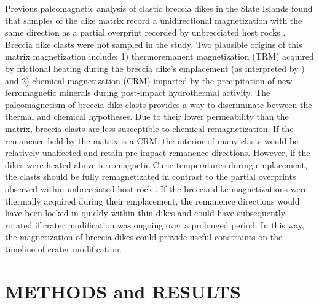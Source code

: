 \documentclass[11pt,letterpaper]{article}
\begin{document}
Previous paleomagnetic analysis of clastic breccia dikes in the Slate Islands found that samples of the dike matrix record a unidirectional magnetization with the same direction as a partial overprint recorded by unbrecciated host rocks \citep*{Halls1979a}. Breccia dike clasts were not sampled in the \cite{Halls1979a} study. Two plausible origins of this matrix magnetization include: 1) thermoremanent magnetization (TRM) acquired by frictional heating during the breccia dike's emplacement (as interpreted by \cite{Halls1979a}) and 2) chemical magnetization (CRM) imparted by the precipitation of new ferromagnetic minerals during post-impact hydrothermal activity. The paleomagnetism of breccia dike clasts provides a way to discriminate between the thermal and chemical hypotheses. Due to their lower permeability than the matrix, breccia clasts are less susceptible to chemical remagnetization. If the remanence held by the matrix is a CRM, the interior of many clasts would be relatively unaffected and retain pre-impact remanence directions. However, if the dikes were heated above ferromagnetic Curie temperatures during emplacement, the clasts should be fully remagnetizated in contrast to the partial overprints observed within unbrecciated host rock \citep{Halls1979a}. If the breccia dike magnetizations were thermally acquired during their emplacement, the remanence directions would have been locked in quickly within thin dikes and could have subsequently rotated if crater modification was ongoing over a prolonged period. In this way, the magnetization of breccia dikes could provide useful constraints on the timeline of crater modification.

\section*{METHODS and RESULTS}
\end{document}
